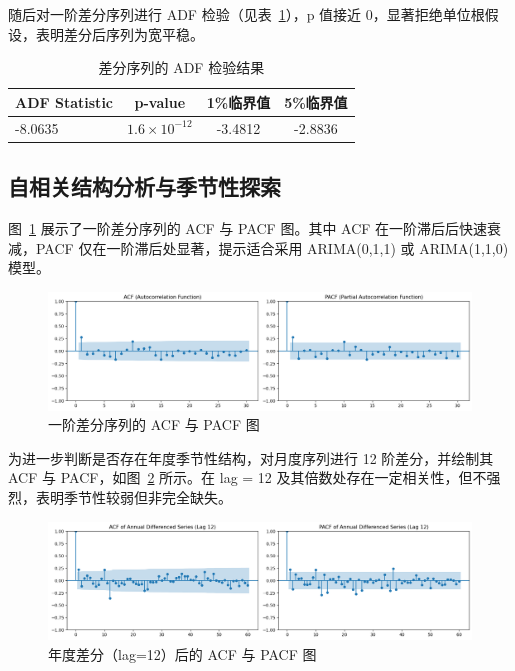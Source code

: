 \documentclass[11pt,a4paper]{article}
\begin{document}
随后对一阶差分序列进行 ADF 检验（见表~\ref{tab:adf-diff}），p 值接近 0，显著拒绝单位根假设，表明差分后序列为宽平稳。

\begin{table}[H]
  \centering
  \caption{差分序列的 ADF 检验结果}
  \begin{tabular}{lccc}
    \toprule
    ADF Statistic & p-value & 1\%临界值 & 5\%临界值 \\
    \midrule
    -8.0635 & $1.6 \times 10^{-12}$ & -3.4812 & -2.8836 \\
    \bottomrule
  \end{tabular}
  \label{tab:adf-diff}
\end{table}

\subsection{自相关结构分析与季节性探索}

图~\ref{fig:acf-pacf} 展示了一阶差分序列的 ACF 与 PACF 图。其中 ACF 在一阶滞后后快速衰减，PACF 仅在一阶滞后处显著，提示适合采用 ARIMA(0,1,1) 或 ARIMA(1,1,0) 模型。

\begin{figure}[H]
  \centering
  \includegraphics[width=1\textwidth]{./figures/ACF&PACF on diff1[0].png}
  \caption{一阶差分序列的 ACF 与 PACF 图}
  \label{fig:acf-pacf}
\end{figure}

为进一步判断是否存在年度季节性结构，对月度序列进行 12 阶差分，并绘制其 ACF 与 PACF，如图~\ref{fig:acf-seasonal} 所示。在 lag = 12 及其倍数处存在一定相关性，但不强烈，表明季节性较弱但非完全缺失。

\begin{figure}[H]
  \centering
  \includegraphics[width=1\textwidth]{./figures/ACF&PACF on diff1[0]1[12].png}
  \caption{年度差分（lag=12）后的 ACF 与 PACF 图}
  \label{fig:acf-seasonal}
\end{figure}
\end{document}
